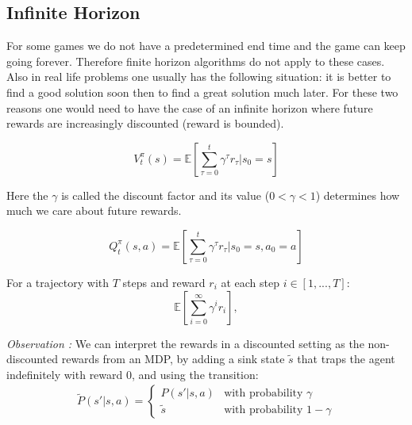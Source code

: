 \documentclass{article}
\begin{document}
\subsection{Infinite Horizon}
For some games we do not have a predetermined end time and the game can keep going forever. Therefore finite horizon algorithms do not apply to these cases. Also in real life problems one usually has the following situation: it is better to find a good solution soon then to find a great solution much later. For these two reasons one would need to have the case of an infinite horizon where future rewards are increasingly discounted (reward is bounded).

\begin{defn}
\[
V^\pi_t(s) = \mathbb{E} \left[ \sum_{\tau=0}^{t}\gamma^\tau r_\tau|s_0=s \right]
\]
\end{defn}
Here the $\gamma$ is called the discount factor and its value ($0<\gamma<1$) determines how much we care about future rewards. 
\begin{defn}
\[
Q^\pi_t(s,a) = \mathbb{E} \left[ \sum_{\tau=0}^{t}\gamma^\tau r_\tau|s_0=s,a_0=a \right]
\]
\end{defn}

\begin{defn}
For a trajectory with $T$ steps and reward $r_{i}$ at each step $i \in [1,...,T]$:
\[
\mathbb{E}\left[\sum_{i=0}^{\infty}\gamma^{i}r_{i}\right], 
\]
\end{defn}

\textit{Observation :} We can interpret the rewards in a discounted setting as the non-discounted rewards from an MDP, by adding a sink state $\tilde s$ that traps the agent indefinitely with reward 0, and using the transition:
\begin{equation*}
\begin{split}
    \tilde P(s'|s,a)= 
    \begin{cases}
        P(s'|s,a)
        &
        \text{with probability $\gamma$}
        \\
        \tilde s
        & 
        \text{with probability $1 - \gamma$}
    \end{cases}
\end{split}
\end{equation*}
\end{document}
